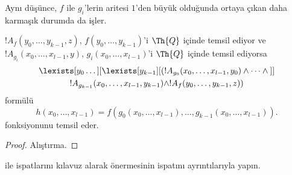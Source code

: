 Aynı düşünce, $f$ ile $g_i$'lerin aritesi $1$'den büyük olduğunda ortaya
çıkan daha karmaşık durumda da işler.

\begin{prop}
$!A_f(y_0,\dots,y_{k-1},z)$, $f(y_0,\dots,y_{k-1})$'i $\Th{Q}$ içinde
temsil ediyor ve $!A_{g_i}(x_0,\dots,x_{l-1},y)$,
$g_i(x_0,\dots,x_{l-1})$'i $\Th{Q}$ içinde temsil ediyorsa
\begin{multline*}
  \lexists[y_0\dots][\lexists[y_{k-1}][(!A_{g_0}(x_0,\dots,x_{l-1},y_0) \land
      \dots \land {}]]\\
  !A_{g_{k-1}}(x_0,\dots,x_{l-1},y_{k-1}) \land !A_f(y_0,\dots,y_{k-1},z))
\end{multline*}
formülü
\[
h(x_0, \dots, x_{l-1}) = f(g_0(x_0, \dots, x_{l-1}), \dots, g_{k-1}(x_0,
\dots, x_{l-1})).
\]
fonksiyonunu temsil eder.
\end{prop}

\begin{proof}
Alıştırma.
\end{proof}

\begin{prob}
 ile 
ispatlarını kılavuz alarak 
önermesinin ispatını ayrıntılarıyla yapın.
\end{prob}

